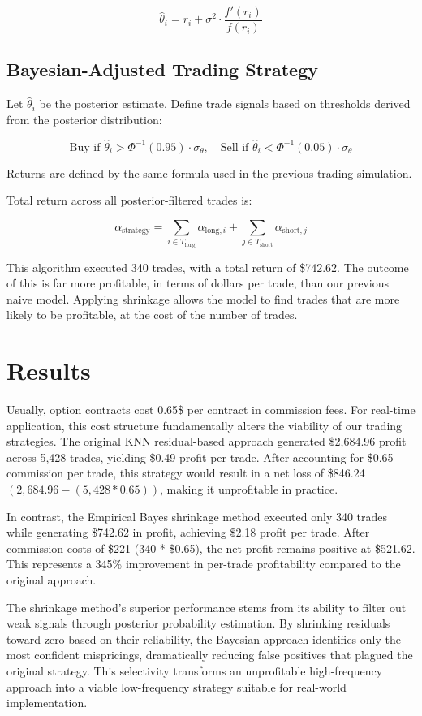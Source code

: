 \documentclass{article}
\begin{document}
\[
\hat{\theta}_i = r_i + \sigma^2 \cdot \frac{f'(r_i)}{f(r_i)}
\]

\subsection{Bayesian-Adjusted Trading Strategy}

Let \( \hat{\theta}_i \) be the posterior estimate. Define trade signals based on thresholds derived from the posterior distribution:

\[
\text{Buy if } \hat{\theta}_i > \Phi^{-1}(0.95) \cdot \sigma_\theta, \quad
\text{Sell if } \hat{\theta}_i < \Phi^{-1}(0.05) \cdot \sigma_\theta
\]

Returns are defined by the same formula used in the previous trading simulation.

Total return across all posterior-filtered trades is:

\[
\alpha_{\text{strategy}} = \sum_{i \in T_{\text{long}}} \alpha_{\text{long}, i} + \sum_{j \in T_{\text{short}}} \alpha_{\text{short}, j}
\]

This algorithm executed 340 trades, with a total return of \$742.62. The outcome of this is far more profitable, in terms of dollars per trade, than our previous naive model. Applying shrinkage allows the model to find trades that are more likely to be profitable, at the cost of the number of trades.

\section{Results}

Usually, option contracts cost 0.65\$ per contract in commission fees. For real-time application, this cost structure fundamentally alters the viability of our trading strategies. The original KNN residual-based approach generated \$2,684.96 profit across 5,428 trades, yielding \$0.49 profit per trade. After accounting for \$0.65 commission per trade, this strategy would result in a net loss of \$846.24 $(2,684.96 - (5,428 * 0.65))$, making it unprofitable in practice.

In contrast, the Empirical Bayes shrinkage method executed only 340 trades while generating \$742.62 in profit, achieving \$2.18 profit per trade. After commission costs of \$221 (340 * \$0.65), the net profit remains positive at \$521.62. This represents a 345\% improvement in per-trade profitability compared to the original approach.

The shrinkage method's superior performance stems from its ability to filter out weak signals through posterior probability estimation. By shrinking residuals toward zero based on their reliability, the Bayesian approach identifies only the most confident mispricings, dramatically reducing false positives that plagued the original strategy. This selectivity transforms an unprofitable high-frequency approach into a viable low-frequency strategy suitable for real-world implementation. 
\end{document}
